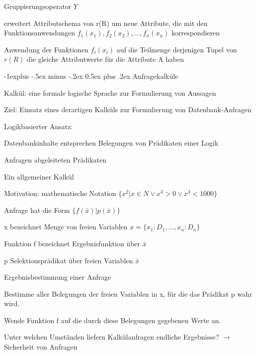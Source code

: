 \documentclass[a4paper]{article}
\makeatletter
\renewcommand{\subsection}{\@startsection{subsection}{2}{0mm}%
                                {-1explus -.5ex minus -.2ex}%
                                {0.5ex plus .2ex}%
                                {\normalfont\normalsize\bfseries}}
\makeatother
\begin{document}
\begin{multicols}{3}
    Gruppierungsoperator $Y$
    \begin{itemize*}
        \item erweitert Attributschema von r(R) um neue Attribute, die mit den Funktionsanwendungen $f_1 (x_1 ), f_2 (x_2 ),..., f_n (x_n )$ korrespondieren
        \item Anwendung der Funktionen $f_i (x_i)$ auf die Teilmenge derjenigen Tupel von $r(R)$ die gleiche Attributwerte für die Attribute A haben
    \end{itemize*}

    \subsection{Anfragekalküle}
    \begin{itemize*}
        \item Kalkül: eine formale logische Sprache zur Formulierung von Aussagen
        \item Ziel: Einsatz eines derartigen Kalküls zur Formulierung von Datenbank-Anfragen
        \item Logikbasierter Ansatz:
        \begin{itemize*}
            \item Datenbankinhalte entsprechen Belegungen von Prädikaten einer Logik
            \item Anfragen abgeleiteten Prädikaten
        \end{itemize*}
    \end{itemize*}

    Ein allgemeiner Kalkül
    \begin{itemize*}
        \item Motivation: mathematische Notation $\{x^2 | x \in N \vee x^3 > 0 \vee x^3 < 1000\}$
        \item Anfrage hat die Form $\{f(\bar{x}) | p(\bar{x})\}$
        \begin{itemize*}
            \item x bezeichnet Menge von freien Variablen $x = \{x_1:D_1,...,x_n:D_n\}$
            \item Funktion f bezeichnet Ergebnisfunktion über $\bar{x}$
            \item p Selektionsprädikat über freien Variablen $\bar{x}$
        \end{itemize*}
        \item Ergebnisbestimmung einer Anfrage
        \begin{itemize*}
            \item Bestimme aller Belegungen der freien Variablen in x, für die das Prädikat p wahr wird.
            \item Wende Funktion f auf die durch diese Belegungen gegebenen Werte an.
        \end{itemize*}
        \item Unter welchen Umständen liefern Kalkülanfragen endliche Ergebnisse? $\rightarrow$ Sicherheit von Anfragen
    \end{itemize*}


\end{multicols}
\end{document}
